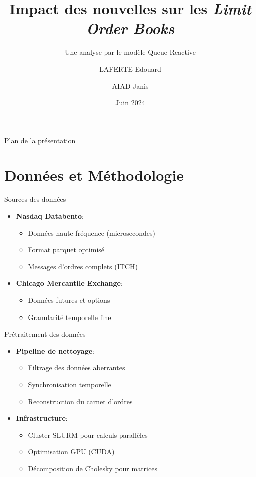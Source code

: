 \documentclass[aspectratio=169]{beamer}  %
\title[Impact des nouvelles sur les LOB]{Impact des nouvelles sur les \textit{Limit Order Books}}
\subtitle{Une analyse par le modèle Queue-Reactive}
\author[LAFERTE \& AIAD]{LAFERTE Edouard \and AIAD Janis}
\institute[École Polytechnique]{
    Département de mathématiques appliquées\\
    École Polytechnique
}
\date{Juin 2024}
\begin{document}
\begin{frame}
    \titlepage
\end{frame}

\begin{frame}{Plan de la présentation}
    \tableofcontents
\end{frame}

\section{Données et Méthodologie}

\begin{frame}{Sources des données}
    \begin{itemize}
        \item \textbf{Nasdaq Databento}:
        \begin{itemize}
            \item Données haute fréquence (microsecondes)
            \item Format parquet optimisé
            \item Messages d'ordres complets (ITCH)
        \end{itemize}
        \item \textbf{Chicago Mercantile Exchange}:
        \begin{itemize}
            \item Données futures et options
            \item Granularité temporelle fine
        \end{itemize}
    \end{itemize}
\end{frame}

\begin{frame}{Prétraitement des données}
    \begin{itemize}
        \item \textbf{Pipeline de nettoyage}:
        \begin{itemize}
            \item Filtrage des données aberrantes
            \item Synchronisation temporelle
            \item Reconstruction du carnet d'ordres
        \end{itemize}
        \item \textbf{Infrastructure}:
        \begin{itemize}
            \item Cluster SLURM pour calculs parallèles
            \item Optimisation GPU (CUDA)
            \item Décomposition de Cholesky pour matrices
        \end{itemize}
    \end{itemize}
\end{frame}
\end{document}
